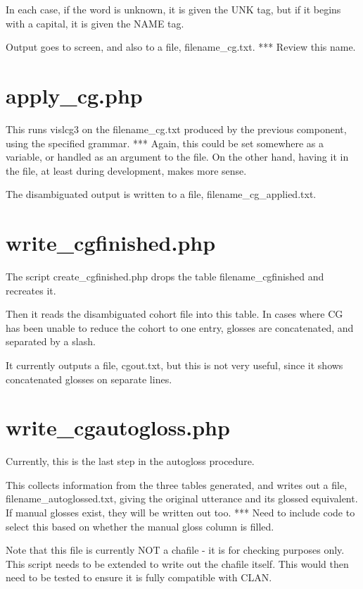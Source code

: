 \documentclass[a4paper,10pt]{article}
\begin{document}
In each case, if the word is unknown, it is given the UNK tag, but if it begins with a capital, it is given the NAME tag.

Output goes to screen, and also to a file, filename\_cg.txt.
*** Review this name.


\section{apply\_cg.php}
\label{sec:applycg}

This runs vislcg3 on the filename\_cg.txt produced by the previous component, using the specified grammar.
*** Again, this could be set somewhere as a variable, or handled as an argument to the file.  On the other hand, having it in the file, at least during development, makes more sense.

The disambiguated output is written to a file, filename\_cg\_applied.txt.


\section{write\_cgfinished.php}
\label{sec:cgfinished}

The script create\_cgfinished.php drops the table filename\_cgfinished and recreates it.

Then it reads the disambiguated cohort file into this table.  In cases where CG has been unable to reduce the cohort to one entry, glosses are concatenated, and separated by a slash.

It currently outputs a file, cgout.txt, but this is not very useful, since it shows concatenated glosses on separate lines.


\section{write\_cgautogloss.php}
\label{sec:autoglossed}

Currently, this is the last step in the autogloss procedure.  

This collects information from the three tables generated, and writes out a file, filename\_autoglossed.txt, giving the original utterance and its glossed equivalent.  If manual glosses exist, they will be written out too.
*** Need to include code to select this based on whether the manual gloss column is filled.

Note that this file is currently NOT a chafile - it is for checking purposes only.  This script needs to be extended to write out the chafile itself.  This would then need to be tested to ensure it is fully compatible with CLAN.
\end{document}
